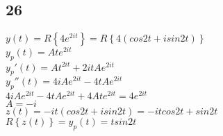 \documentclass[12pt, a4paper]{IEEEtran}
\begin{document}
\begin{flushleft}
    \section*{26}
    $y(t)=R\left\{4e^{2it}\right\}=R\left\{4(cos2t+isin2t)\right\}$\\
    $y_p(t)=Ate^{2it}$\\
    $y_p'(t)=At^{2it}+2itAe^{2it}$\\
    $y_p''(t)=4iAe^{2it}-4tAe^{2it}$\\
    $4iAe^{2it}-4tAe^{2it}+4Ate^{2it}=4e^{2it}$\\
    $A=-i$\\
    $z(t)=-it(cos2t+isin2t)=-itcos2t+sin2t$\\
    $R\left\{z(t)\right\}=y_p(t)=tsin2t$
    

    \end{flushleft}
    
\end{document}
